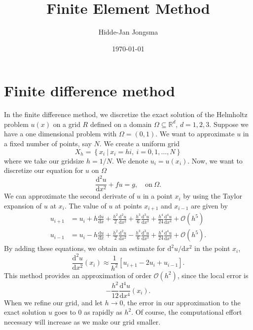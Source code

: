 \documentclass[a4paper]{article}
\author{Hidde-Jan Jongsma}
\title{Finite Element Method}
\date{\today}
\newcommand{\Reals}{\mathbb{R}}
\newcommand{\dd}{\mathrm{d}}
\begin{document}
\section{Finite difference method}

In the finite difference method, we discretize the exact solution of
the Helmholtz problem $u(x)$ on a grid $R$ defined on a domain $\Omega
\subseteq \Reals^d$, $d = 1, 2, 3$. Suppose we have a one dimensional
problem with $\Omega = (0, 1)$. We want to approximate $u$ in a fixed
number of points, say $N$. We create a uniform grid
\begin{equation}
  X_h = \left\{ x_i\ |\ x_i = h i,\ i = 0, 1, \ldots, N \right\}
\end{equation}
where we take our gridsize $h = 1/N$. We denote $u_i = u(x_i)$. Now,
we want to discretize our equation for $u$ on $\Omega$
\begin{equation}
  \frac{\dd^2 u}{\dd x^2} + f u = g, \quad \text{on}\ \Omega.
\end{equation}
We can approximate the second derivate of $u$ in a point $x_i$ by
using the Taylor expansion of $u$ at $x_i$. The value of $u$ at points
$x_{i + 1}$ and $x_{i - 1}$ are given by
\begin{align}
  u_{i + 1} & = u_{i} + h \frac{\dd u}{\dd x}
    + \frac{h^2}{2} \frac{\dd^2 u}{\dd x^2}
    + \frac{h^3}{6} \frac{\dd^3 u}{\dd x^3}
    + \frac{h^4}{24} \frac{\dd^4 u}{\dd x^4} 
    + \mathcal{O}(h^5) \\
%
  u_{i - 1} & = u_{i} - h \frac{\dd u}{\dd x}
    + \frac{h^2}{2} \frac{\dd^2 u}{\dd x^2}
    - \frac{h^3}{6} \frac{\dd^3 u}{\dd x^3}
    + \frac{h^4}{24} \frac{\dd^4 u}{\dd x^4}
    + \mathcal{O}(h^5).
\end{align}
By adding these equations, we obtain an estimate for $\dd^2 u / \dd
x^2$ in the point $x_i$,
\begin{equation}
  \frac{\dd^2 u}{\dd x^2}(x_i)
  \approx
    \frac{1}{h^2} \left[ u_{i + 1} - 2 u_i + u_{i - 1} \right].
\end{equation}
This method provides an approximation of order $\mathcal{O}(h^2)$,
since the local error is
\begin{equation*}
  - \frac{h^2}{12} \frac{\dd^4 u}{\dd x^4}(x_i).
\end{equation*}
When we refine our grid, and let $h \rightarrow 0$, the error in our
approximation to the exact solution $u$ goes to $0$ as rapidly as
$h^2$. Of course, the computational effort necessary will increase as
we make our grid smaller.
\end{document}
